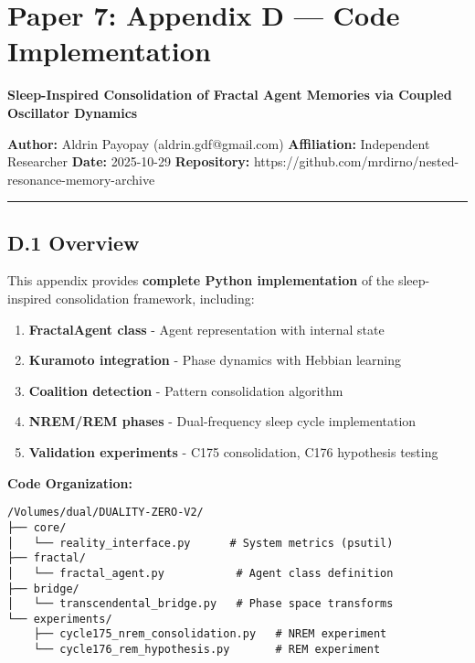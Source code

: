 \documentclass[
]{article}
\author{}
\date{}
\providecommand{\tightlist}{%
  \setlength{\itemsep}{0pt}\setlength{\parskip}{0pt}}
\begin{document}
\section{Paper 7: Appendix D --- Code
Implementation}\label{paper-7-appendix-d-code-implementation}

\textbf{Sleep-Inspired Consolidation of Fractal Agent Memories via
Coupled Oscillator Dynamics}

\textbf{Author:} Aldrin Payopay (aldrin.gdf@gmail.com)
\textbf{Affiliation:} Independent Researcher \textbf{Date:} 2025-10-29
\textbf{Repository:}
https://github.com/mrdirno/nested-resonance-memory-archive

\begin{center}\rule{0.5\linewidth}{0.5pt}\end{center}

\subsection{D.1 Overview}\label{d.1-overview}

This appendix provides \textbf{complete Python implementation} of the
sleep-inspired consolidation framework, including:

\begin{enumerate}
\def\labelenumi{\arabic{enumi}.}
\tightlist
\item
  \textbf{FractalAgent class} - Agent representation with internal state
\item
  \textbf{Kuramoto integration} - Phase dynamics with Hebbian learning
\item
  \textbf{Coalition detection} - Pattern consolidation algorithm
\item
  \textbf{NREM/REM phases} - Dual-frequency sleep cycle implementation
\item
  \textbf{Validation experiments} - C175 consolidation, C176 hypothesis
  testing
\end{enumerate}

\textbf{Code Organization:}

\begin{verbatim}
/Volumes/dual/DUALITY-ZERO-V2/
├── core/
│   └── reality_interface.py      # System metrics (psutil)
├── fractal/
│   └── fractal_agent.py           # Agent class definition
├── bridge/
│   └── transcendental_bridge.py   # Phase space transforms
└── experiments/
    ├── cycle175_nrem_consolidation.py   # NREM experiment
    └── cycle176_rem_hypothesis.py       # REM experiment
\end{verbatim}
\end{document}
